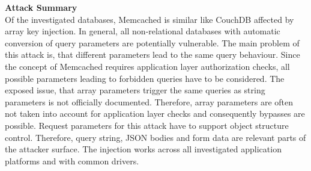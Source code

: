 \textbf{Attack Summary} \\
Of the investigated databases, Memcached is similar like CouchDB affected by array key injection. In general, all non-relational databases with automatic conversion of query parameters are potentially vulnerable. The main problem of this attack is, that different parameters lead to the same query behaviour. Since the concept of Memcached requires application layer authorization checks, all possible parameters leading to forbidden queries have to be considered. The exposed issue, that array parameters trigger the same queries as string parameters is not officially documented. Therefore, array parameters are often not taken into account for application layer checks and consequently bypasses are possible. Request parameters for this attack have to support object structure control. Therefore, query string, JSON bodies and form data are relevant parts of the attacker surface. The injection works across all investigated application platforms and with common drivers. 